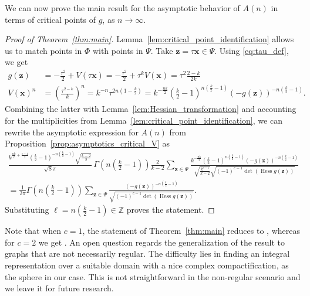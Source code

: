 \documentclass[a4paper,oneside]{amsart}
\newcommand{\bb}[1]{\boldsymbol{#1}}
\numberwithin{theorem}{section}
\theoremstyle{remark}
\newcommand{\Z}{\mathbb{Z}}
\DeclareMathOperator{\Hess}{Hess}
\begin{document}
We can now prove the main result for the asymptotic behavior of $A(n)$ in terms of critical points of $g$, as $n\to \infty$.

\begin{proof}[Proof of Theorem~\ref{thm:main}]
  Lemma~\ref{lem:critical_point_identification} allows us to match points in $\Phi$ with points in $\Psi$. Take $\bb{z} = \tau\bb{x} \in \Psi$. Using \eqref{eq:tau_def}, we get
  \begin{align*}
    g(\bb{z}) &= -\frac{\tau^2}{2} + V(\tau\bb{x}) = -\frac{\tau^2}{2} + \tau^k V(\bb{x}) = \tau^2 \frac{2-k}{2k}\\
    V(\bb{x})^{n} &= \left( \frac{\tau^{2-k}}{k} \right)^{n} = k^{-n}\tau^{2n(1-\frac{k}{2})} = k^{-\frac{nk}{2}}\left(\frac{k}{2}-1\right)^{n(\frac{k}{2}-1)} (-g(\bb{z}))^{-n(\frac{k}{2}-1)}.
  \end{align*}
  Combining the latter with Lemma~\ref{lem:Hessian_transformation} and accounting for the multiplicities from Lemma~\ref{lem:critical_point_identification}, we can rewrite the asymptotic expression for $A(n)$ from Proposition~\ref{prop:asymptotics_critical_V} as 
  \begin{gather*}
     \frac{k^{\frac{nk}{2} + \frac{c-1}{2}} \left(\frac{k}{2}-1\right)^{-n(\frac{k}{2}-1)}\sqrt{\frac{k-2}{2}}}{\sqrt{8}\pi}\, \Gamma\!\left(n\left(\frac{k}{2}-1\right) \right) \frac{2}{k-2} 
    \sum_{\bb{z}\in\Psi} \frac{k^{-\frac{nk}{2}}\left(\frac{k}{2}-1\right)^{n(\frac{k}{2}-1)} (-g(\bb{z}))^{-n(\frac{k}{2}-1)}}{\sqrt{\frac{k^{c-1}}{k-2}} \sqrt{(-1)^{c-1} \det \left( \Hess g(\bb{z}) \right)}} \\
    = \frac{1}{2 \pi} \Gamma\!\left(n\left(\frac{k}{2}-1\right) \right) \sum_{\bb{z}\in\Psi} \frac{(-g(\bb{z}))^{-n(\frac{k}{2}-1)}}{\sqrt{(-1)^{c-1}\det \left( \Hess g(\bb{z}) \right)}}. 
  \end{gather*}
  Substituting $\ell = n(\frac{k}{2}-1) \in \Z$ proves the statement.
\end{proof}

Note that when $c=1$, the statement of Theorem~\ref{thm:main} reduces to \cite[Theorem 3.3.1]{Borinsky:2018mdl}, whereas for $c=2$ we get \cite[Theorem 5.3]{BMW24:Bicolored}. 
An open question regards the generalization of the result to graphs that are not necessarily regular. The difficulty lies in finding an integral representation over a suitable domain with a nice complex compactification, as the sphere in our case. This is not straightforward in the non-regular scenario and we leave it for future research.
\end{document}
